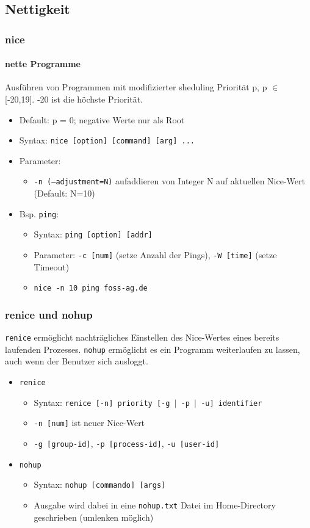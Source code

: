 \documentclass[12pt,utf8, handout]{beamer}
\begin{document}
\subsection{Nettigkeit}
\begin{frame}
\frametitle{nice}
\framesubtitle{nette Programme}
Ausführen von Programmen mit modifizierter sheduling Priorität p, p $\in$ [-20,19]. -20 ist die höchste Priorität.
\begin{itemize}[<+->]
	\item {\scriptsize Default: p = 0; negative Werte nur als Root}
	\item Syntax: \texttt{nice [option] [command] [arg] ...}
	\item Parameter:
	\begin{itemize}
		\item {\scriptsize \texttt{-n (--adjustment=N)} aufaddieren von Integer N auf aktuellen Nice-Wert (Default: N=10)}
	\end{itemize}
	\item Bsp. \texttt{ping}:
	\begin{itemize}[<+->]
		\item {\scriptsize Syntax: \texttt{ping [option] [addr]}}
		\item {\scriptsize Parameter: \texttt{-c [num]} (setze Anzahl der Pings), \texttt{-W [time]} (setze Timeout)}
		\item \texttt{nice -n 10 ping foss-ag.de}
	\end{itemize}
\end{itemize}
\end{frame}

\begin{frame}
\frametitle{renice und nohup}
\texttt{renice} ermöglicht nachträgliches Einstellen des Nice-Wertes eines bereits laufenden Prozesses.
\texttt{nohup} ermöglicht es ein Programm weiterlaufen zu lassen, auch wenn der Benutzer sich ausloggt.
\begin{itemize}
	\item \texttt{renice}
	\begin{itemize}[<+->]
		\item Syntax: \texttt{renice [-n] priority [-g $\mid$ -p $\mid$ -u] identifier}
		\item \texttt{-n [num]} ist neuer Nice-Wert
		\item \texttt{-g [group-id]}, \texttt{-p [process-id]}, \texttt{-u [user-id]}
	\end{itemize}
	\item \texttt{nohup}
	\begin{itemize}
		\item Syntax: \texttt{nohup [commando] [args]}
		\item Ausgabe wird dabei in eine \texttt{nohup.txt} Datei im Home-Directory geschrieben (umlenken möglich)
	\end{itemize}
\end{itemize}
\end{frame}
\end{document}
